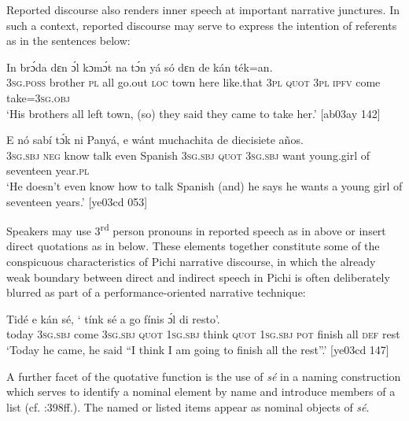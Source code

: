 Reported discourse also renders inner speech at important narrative junctures. In such a context, reported discourse may serve to express the intention of referents as in the sentences below:


\ea%
    \label{ex:key:1373}
    \gll In    brɔ́da  dɛn  ɔ́l  kɔmɔ́t  na  tɔ́n    yá    só  
   dɛn  de  kán    ték=an.\\
\textsc{3sg.poss}  brother  \textsc{pl}  all  go.out  \textsc{loc}  town  here    like.that
\textsc{3pl}  \textsc{quot} \textsc{3pl}  \textsc{ipfv}  come  take=\textsc{3sg.obj}\\

\glt ‘His brothers all left town, (so) they said they came to take her.’ [ab03ay 142]
\z


\ea%
    \label{ex:key:1374}
    \gll E    nó  sabí    tɔ́k  ni    Panyá,       e    wánt
muchachita  de  diecisiete  años.\\
\textsc{3sg.sbj}  \textsc{neg}  know  talk  even  Spanish  \textsc{3sg.sbj}  \textsc{quot}    \textsc{3sg.sbj}  want
young.girl  of  seventeen  year.\textsc{pl}\\

\glt ‘He doesn’t even know how to talk Spanish (and) he says he wants a young girl 
of seventeen years.’ [ye03cd 053]
\z

Speakers may use 3\textsuperscript{rd} person pronouns in reported speech as in  above or insert direct quotations as in  below. These elements together constitute some of the conspicuous characteristics of Pichi narrative discourse, in which the already weak boundary between direct and indirect speech in Pichi is often deliberately blurred as part of a performance-oriented narrative technique:


\ea%
    \label{ex:key:1375}
    \gll Tidé    e    kán        sé,    ‘    tínk    sé
a    go  fínis    ɔ́l  di  resto’.\\
today  \textsc{3sg.sbj}  come  \textsc{3sg.sbj}  \textsc{quot}    \textsc{1sg.sbj}  think  \textsc{quot}  
\textsc{1sg.sbj}  \textsc{pot} finish  all  \textsc{def}  rest\\

\glt ‘Today he came, he said “I think I am going to finish all the rest”.’ [ye03cd 147]
\z

A further facet of the quotative function is the use of \textit{sé} in a naming construction which serves to identify a nominal element by name and introduce members of a list (cf. \citealt{Güldemann2008}:398ff.). The named or listed items appear as nominal objects of \textit{sé}. 


